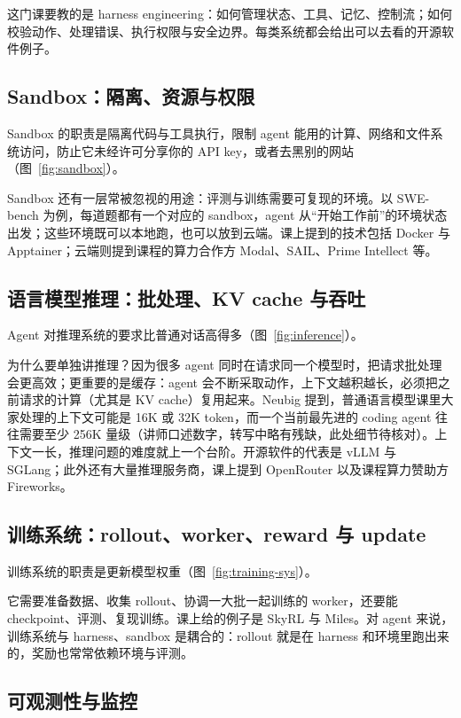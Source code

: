 \documentclass[a4paper]{article}
\begin{document}
这门课要教的是 harness engineering：如何管理状态、工具、记忆、控制流；如何校验动作、处理错误、执行权限与安全边界。每类系统都会给出可以去看的开源软件例子。

\subsection{Sandbox：隔离、资源与权限}

Sandbox 的职责是隔离代码与工具执行，限制 agent 能用的计算、网络和文件系统访问，防止它未经许可分享你的 API key，或者去黑别的网站（图~\ref{fig:sandbox}）。

Sandbox 还有一层常被忽视的用途：评测与训练需要可复现的环境。以 SWE-bench 为例，每道题都有一个对应的 sandbox，agent 从“开始工作前”的环境状态出发；这些环境既可以本地跑，也可以放到云端。课上提到的技术包括 Docker 与 Apptainer；云端则提到课程的算力合作方 Modal、SAIL、Prime Intellect 等。

\subsection{语言模型推理：批处理、KV cache 与吞吐}

Agent 对推理系统的要求比普通对话高得多（图~\ref{fig:inference}）。

为什么要单独讲推理？因为很多 agent 同时在请求同一个模型时，把请求批处理会更高效；更重要的是缓存：agent 会不断采取动作，上下文越积越长，必须把之前请求的计算（尤其是 KV cache）复用起来。Neubig 提到，普通语言模型课里大家处理的上下文可能是 16K 或 32K token，而一个当前最先进的 coding agent 往往需要至少 256K 量级（讲师口述数字，转写中略有残缺，此处细节待核对）。上下文一长，推理问题的难度就上一个台阶。开源软件的代表是 vLLM 与 SGLang；此外还有大量推理服务商，课上提到 OpenRouter 以及课程算力赞助方 Fireworks。

\subsection{训练系统：rollout、worker、reward 与 update}

训练系统的职责是更新模型权重（图~\ref{fig:training-sys}）。

它需要准备数据、收集 rollout、协调一大批一起训练的 worker，还要能 checkpoint、评测、复现训练。课上给的例子是 SkyRL 与 Miles。对 agent 来说，训练系统与 harness、sandbox 是耦合的：rollout 就是在 harness 和环境里跑出来的，奖励也常常依赖环境与评测。

\subsection{可观测性与监控}
\end{document}
